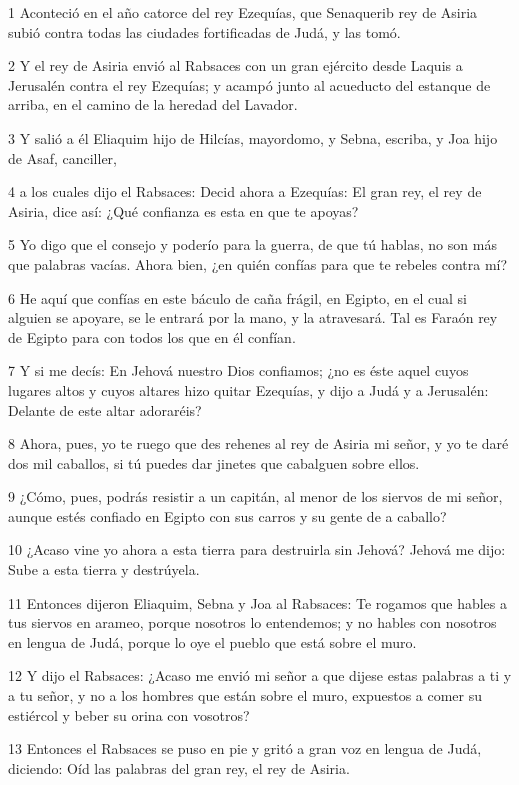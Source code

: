 \par 1 Aconteció en el año catorce del rey Ezequías, que Senaquerib rey de Asiria subió contra todas las ciudades fortificadas de Judá, y las tomó.
\par 2 Y el rey de Asiria envió al Rabsaces con un gran ejército desde Laquis a Jerusalén contra el rey Ezequías; y acampó junto al acueducto del estanque de arriba, en el camino de la heredad del Lavador.
\par 3 Y salió a él Eliaquim hijo de Hilcías, mayordomo, y Sebna, escriba, y Joa hijo de Asaf, canciller,
\par 4 a los cuales dijo el Rabsaces: Decid ahora a Ezequías: El gran rey, el rey de Asiria, dice así: ¿Qué confianza es esta en que te apoyas?
\par 5 Yo digo que el consejo y poderío para la guerra, de que tú hablas, no son más que palabras vacías. Ahora bien, ¿en quién confías para que te rebeles contra mí?
\par 6 He aquí que confías en este báculo de caña frágil, en Egipto, en el cual si alguien se apoyare, se le entrará por la mano, y la atravesará. Tal es Faraón rey de Egipto para con todos los que en él confían.
\par 7 Y si me decís: En Jehová nuestro Dios confiamos; ¿no es éste aquel cuyos lugares altos y cuyos altares hizo quitar Ezequías, y dijo a Judá y a Jerusalén: Delante de este altar adoraréis?
\par 8 Ahora, pues, yo te ruego que des rehenes al rey de Asiria mi señor, y yo te daré dos mil caballos, si tú puedes dar jinetes que cabalguen sobre ellos.
\par 9 ¿Cómo, pues, podrás resistir a un capitán, al menor de los siervos de mi señor, aunque estés confiado en Egipto con sus carros y su gente de a caballo?
\par 10 ¿Acaso vine yo ahora a esta tierra para destruirla sin Jehová? Jehová me dijo: Sube a esta tierra y destrúyela.
\par 11 Entonces dijeron Eliaquim, Sebna y Joa al Rabsaces: Te rogamos que hables a tus siervos en arameo, porque nosotros lo entendemos; y no hables con nosotros en lengua de Judá, porque lo oye el pueblo que está sobre el muro.
\par 12 Y dijo el Rabsaces: ¿Acaso me envió mi señor a que dijese estas palabras a ti y a tu señor, y no a los hombres que están sobre el muro, expuestos a comer su estiércol y beber su orina con vosotros?
\par 13 Entonces el Rabsaces se puso en pie y gritó a gran voz en lengua de Judá, diciendo: Oíd las palabras del gran rey, el rey de Asiria.
